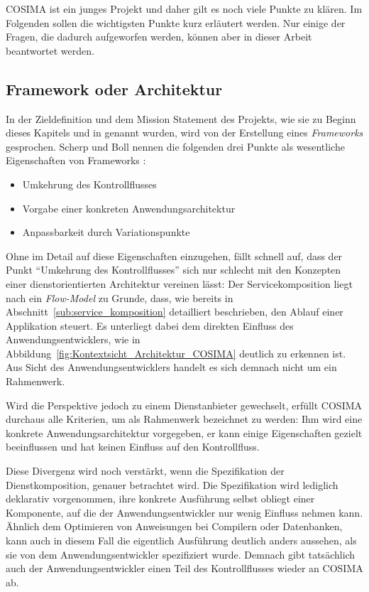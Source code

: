   COSIMA ist ein junges Projekt und daher gilt es noch viele Punkte zu klären. Im Folgenden sollen die wichtigsten Punkte kurz erläutert werden. Nur einige der Fragen, die dadurch aufgeworfen werden, können aber in dieser Arbeit beantwortet werden.
  
\subsection{Framework oder Architektur} %
\label{sub:framework_oder_architektur}

  In der Zieldefinition und dem Mission Statement des Projekts, wie sie zu Beginn dieses Kapitels und in \citep{bericht} genannt wurden, wird von der Erstellung eines \emph{Frameworks} gesprochen. Scherp und Boll nennen die folgenden drei Punkte als wesentliche Eigenschaften von Frameworks \citep[S. 396f]{scherp2006fe}:
  
  \begin{itemize}
    \item Umkehrung des Kontrollflusses
    \item Vorgabe einer konkreten Anwendungsarchitektur
    \item Anpassbarkeit durch Variationspunkte
  \end{itemize}
  
  Ohne im Detail auf diese Eigenschaften einzugehen, fällt schnell auf, dass der Punkt "`Umkehrung des Kontrollflusses"' sich nur schlecht mit den Konzepten einer dienstorientierten Architektur vereinen lässt: Der Servicekomposition liegt nach \citep[S. 320]{web_services_principles_and_technology} ein \emph{Flow-Model} zu Grunde, dass, wie bereits in Abschnitt~\ref{sub:service_komposition} detailliert beschrieben, den Ablauf einer Applikation steuert. Es unterliegt dabei dem direkten Einfluss des Anwendungsentwicklers, wie in Abbildung~\ref{fig:Kontextsicht_Architektur_COSIMA} deutlich zu erkennen ist. Aus Sicht des Anwendungsentwicklers handelt es sich demnach nicht um ein Rahmenwerk.
  
  Wird die Perspektive jedoch zu einem Dienstanbieter gewechselt, erfüllt COSIMA durchaus alle Kriterien, um als Rahmenwerk bezeichnet zu werden: Ihm wird eine konkrete Anwendungsarchitektur vorgegeben, er kann einige Eigenschaften gezielt beeinflussen und hat keinen Einfluss auf den Kontrollfluss.
  
  Diese Divergenz wird noch verstärkt, wenn die Spezifikation der Dienstkomposition, genauer betrachtet wird. Die Spezifikation wird lediglich deklarativ vorgenommen, ihre konkrete Ausführung selbst obliegt einer Komponente, auf die der Anwendungsentwickler nur wenig Einfluss nehmen kann. Ähnlich dem Optimieren von Anweisungen bei Compilern oder Datenbanken, kann auch in diesem Fall die eigentlich Ausführung deutlich anders aussehen, als sie von dem Anwendungsentwickler spezifiziert wurde. Demnach gibt tatsächlich auch der Anwendungsentwickler einen Teil des Kontrollflusses wieder an COSIMA ab.
  
